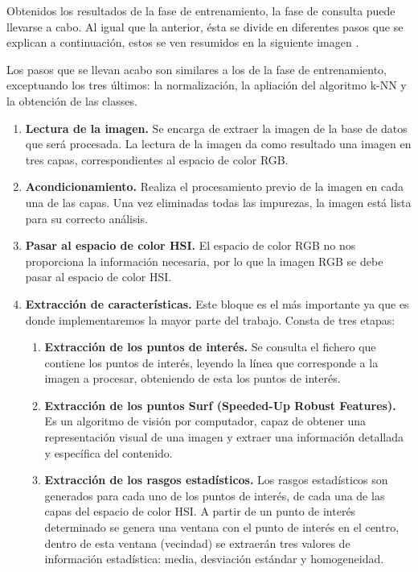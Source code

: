 Obtenidos los resultados de la fase de entrenamiento, la fase de consulta puede llevarse a cabo. Al igual que la anterior, \'esta se divide en diferentes pasos que se explican a continuación, estos se ven resumidos en la siguiente imagen .


Los pasos que se llevan acabo son similares a los de la fase de entrenamiento, exceptuando los tres \'ultimos: la normalización, la apliaci\'on del algoritmo k-NN y la obtenci\'on de las classes.

\begin{enumerate}
	\item \textbf{Lectura de la imagen.} Se encarga de extraer la imagen de la base de datos que ser\'a procesada. La lectura de la imagen da como resultado una imagen en tres capas, correspondientes al espacio de color RGB.
	\item \textbf{Acondicionamiento.} Realiza el procesamiento previo de la imagen en cada una de las capas. Una vez eliminadas todas las impurezas, la imagen est\'a lista para su correcto an\'alisis.
	\item \textbf{Pasar al espacio de color HSI.} El espacio de color RGB no nos proporciona la informaci\'on necesaria, por lo que la imagen RGB se debe pasar al espacio de color HSI.
	\item \textbf{Extracci\'on de caracter\'isticas.} Este bloque es el m\'as importante ya que es donde implementaremos la mayor parte del trabajo. Consta de tres etapas:
		\begin{enumerate}
		\item \textbf{Extracci\'on de los puntos de inter\'es.} Se consulta el fichero que contiene los puntos de inter\'es, leyendo la l\'inea que corresponde a la imagen a procesar, obteniendo de esta los puntos de inter\'es.
		\item \textbf{Extracci\'on de los puntos Surf (Speeded-Up Robust Features).} Es un algoritmo de visi\'on por computador, capaz de obtener una representaci\'on visual de una imagen y extraer una informaci\'on detallada y espec\'ifica del contenido. 
		\item \textbf{Extracci\'on de los rasgos estad\'isticos.} Los rasgos estad\'isticos son generados para cada uno de los puntos de inter\'es, de cada una de las capas del espacio de color HSI. A partir de un punto de inter\'es determinado se genera una ventana con el punto de inter\'es en el centro, dentro de esta ventana (vecindad) se extraer\'an tres valores de informaci\'on estad\'istica: media, desviaci\'on est\'andar y homogeneidad.

\end{enumerate}
\end{enumerate}
